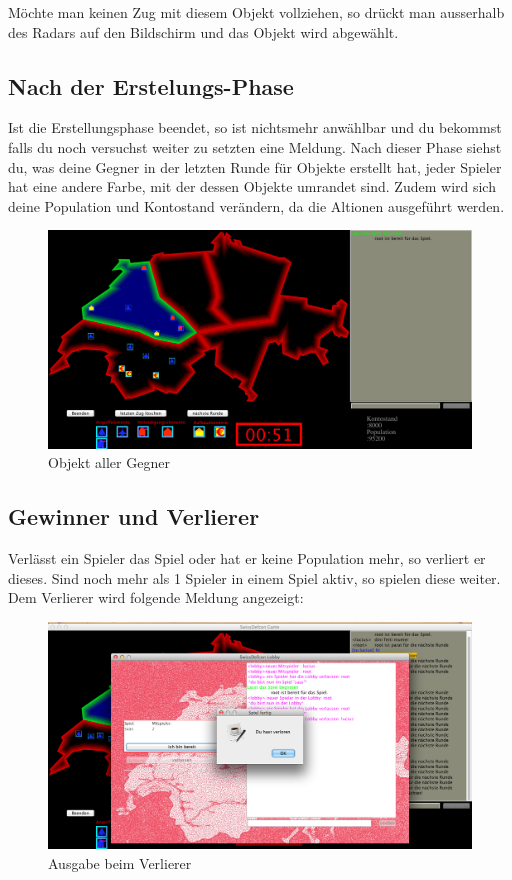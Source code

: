 \documentclass[ngerman, 12pt, pdftex]{scrartcl}[2006/07/30]
\begin{document}
Möchte man keinen Zug mit diesem Objekt vollziehen, so drückt man ausserhalb des Radars auf den Bildschirm und das Objekt wird abgewählt.

\newpage

\subsection{Nach der Erstelungs-Phase}

Ist die Erstellungsphase beendet, so ist nichtsmehr anwählbar und du bekommst falls du noch versuchst weiter zu setzten eine Meldung.
Nach dieser Phase siehst du, was deine Gegner in der letzten Runde für Objekte erstellt hat, jeder Spieler hat eine andere Farbe, mit der dessen Objekte umrandet sind. Zudem wird sich deine Population und Kontostand verändern, da die Altionen ausgeführt werden.

\begin{figure}[h]
\centering
\includegraphics[scale=0.3]{spiel/Objekt_gegner.png}
\caption{Objekt aller Gegner}
\end{figure}

\newpage

\subsection{Gewinner und Verlierer}

Verlässt ein Spieler das Spiel oder hat er keine Population mehr, so verliert er dieses. Sind noch mehr als 1 Spieler in einem Spiel aktiv, so spielen diese weiter.
Dem Verlierer wird folgende Meldung angezeigt:

\begin{figure}[h]
\centering
\includegraphics[scale=0.29]{spiel/verloren.png}
\caption{Ausgabe beim Verlierer}
\end{figure}
\end{document}

